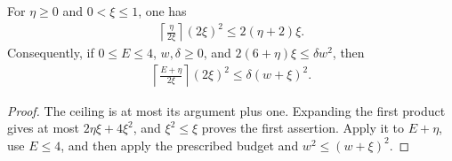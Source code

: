 \begin{lemma}
    \label{lem:spectral_window_count_budget}
    \leanok
    For $\eta\ge0$ and $0<\xi\le1$, one has
    \begin{align*}
        \left\lceil\frac\eta{2\xi}\right\rceil(2\xi)^2
        \le2(\eta+2)\xi.
    \end{align*}
    Consequently, if $0\le E\le4$, $w,\delta\ge0$, and
    $2(6+\eta)\xi\le\delta w^2$, then
    \begin{align*}
        \left\lceil\frac{E+\eta}{2\xi}\right\rceil(2\xi)^2
        \le\delta(w+\xi)^2.
    \end{align*}
\end{lemma}
\begin{proof}\leanok
    The ceiling is at most its argument plus one. Expanding the first
    product gives at most $2\eta\xi+4\xi^2$, and $\xi^2\le\xi$ proves
    the first assertion. Apply it to $E+\eta$, use $E\le4$, and then
    apply the prescribed budget and $w^2\le(w+\xi)^2$.
\end{proof}
